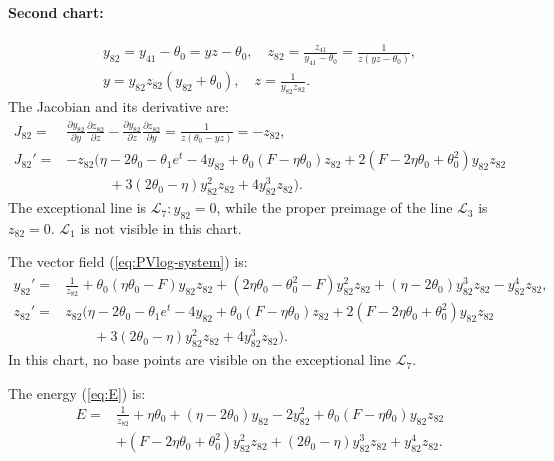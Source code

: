 \paragraph{Second chart:}
\begin{gather*}
y_{82}=y_{41}-\theta_0=yz-\theta_0,
\quad
z_{82}=\frac{z_{41}}{y_{41}-\theta_0}=\frac{1}{z(yz-\theta_0)},
\\
y=y_{82}z_{82}(y_{82}+\theta_0),
\quad
z=\frac1{y_{82}z_{82}}.
\end{gather*}
The Jacobian and its derivative are:
$$
\begin{aligned}
J_{82}=& \frac{\partial y_{82}}{\partial y}\frac{\partial z_{82}}{\partial z}-\frac{\partial y_{82}}{\partial z}\frac{\partial z_{82}}{\partial y}
=\frac{1}{z(\theta_0 -yz)}=-z_{82},
\\
J_{82}'=& -z_{82}(
\eta - 2 \theta_0 - \theta_1 e^t- 4 y_{82} + 
\theta_0(F - \eta \theta_0) z_{82} 
+ 2( F-2 \eta \theta_0 + \theta_0^2) y_{82} z_{82} 
\\
&\qquad\quad
+3(2\theta_0- \eta) y_{82}^2 z_{82} + 4 y_{82}^3 z_{82}
 ).
\end{aligned}
$$
The exceptional line is $\mathcal{L}_7 : y_{82}=0$, while the proper preimage of the line $\mathcal{L}_{3}$ is $z_{82}=0$. 
$\mathcal{L}_1$ is not visible in this chart.

The vector field  (\ref{eq:PVlog-system}) is:
$$
\begin{aligned}
y_{82}'=&
\frac{1}{z_{82}} 
+\theta_0(\eta\theta_0-F) y_{82} z_{82}
+(  2 \eta \theta_0  - \theta_0^2-F) y_{82}^2 z_{82} + (\eta  -  2 \theta_0) y_{82}^3 z_{82} - y_{82}^4 z_{82}
,
\\
z_{82}'=&
z_{82}(
\eta - 2 \theta_0 - \theta_1 e^t- 4 y_{82} + 
\theta_0(F - \eta \theta_0) z_{82} 
+ 2( F-2 \eta \theta_0 + \theta_0^2) y_{82} z_{82} 
\\
&\qquad
+3(2\theta_0- \eta) y_{82}^2 z_{82} + 4 y_{82}^3 z_{82}
 )
.
\end{aligned}
$$
In this chart, no base points are visible on the exceptional line $\mathcal{L}_7$.

The energy (\ref{eq:E}) is:
$$
\begin{aligned}
E=&
\frac{1}{z_{82}}
+\eta \theta_0
+(\eta -2 \theta_0) y_{82}
-2 y_{82}^2
+\theta_0(F-\eta \theta_0) y_{82} z_{82}
\\&
+(F-2 \eta \theta_0 +\theta_0^2) y_{82}^2 z_{82}
+(2 \theta_0 -\eta) y_{82}^3 z_{82}
+y_{82}^4 z_{82}
.
\end{aligned}
$$



